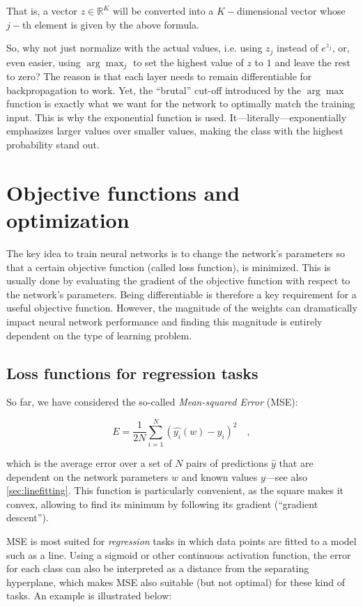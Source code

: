 That is, a vector $z \in \mathbb{R}^K$ will be converted into a $K-$dimensional vector whose $j-$th element is given by the above formula.

So, why not just normalize with the actual values, i.e. using $z_j$ instead of $e^{z_j}$, or, even easier, using $\arg \max_j$ to set the highest value of $z$ to $1$ and leave the rest to zero?
The reason is that each layer needs to remain differentiable for backpropagation to work.
Yet, the ``brutal'' cut-off introduced by the $\arg \max$ function is exactly what we want for the network to optimally match the training input. This is why the exponential function is used. It---literally---exponentially emphasizes larger values over smaller values, making the class with the highest probability stand out.

\section{Objective functions and optimization}

The key idea to train neural networks is to change the network's parameters so that a certain objective function (called loss function), is minimized.
This is usually done by evaluating the gradient of the objective function with respect to the network's parameters. Being differentiable is therefore a key requirement for a useful objective function.
However, the magnitude of the weights can dramatically impact neural network performance and finding this magnitude is entirely dependent on the type of learning problem.

\subsection{Loss functions for regression tasks}

So far, we have considered the so-called \textsl{Mean-squared Error} (MSE):

\begin{equation}
E=\frac{1}{2N}\sum_{i=1}^{N}(\hat{y_i}(w)-y_i)^2\quad ,
\end{equation}

which is the average error over a set of $N$ pairs of predictions $\hat{y}$ that are dependent on the network parameters $w$ and known values $y$---see also \cref{sec:linefitting}. This function is particularly convenient, as the square makes it convex, allowing to find its minimum by following its gradient (``gradient descent'').

MSE is most suited for \textsl{regression} tasks in which data points are fitted to a model such as a line. Using a sigmoid or other continuous activation function, the error for each class can also be interpreted as a distance from the separating hyperplane, which makes MSE also suitable (but not optimal) for these kind of tasks. An example is illustrated below:

